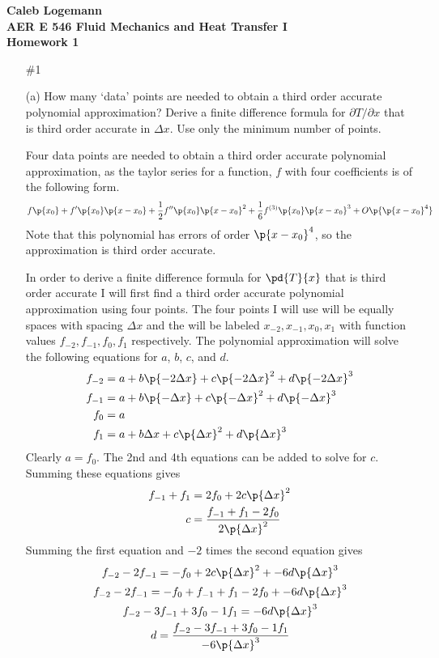 \documentclass[11pt, oneside]{article}
\begin{document}
\noindent \textbf{\Large{Caleb Logemann \\
AER E 546 Fluid Mechanics and Heat Transfer I \\
Homework 1
}}

%
\begin{enumerate}
  \item[\#1] %
    \item[(a)] %
      How many `data' points are needed to obtain a third order accurate
      polynomial approximation?
      Derive a finite difference formula for $\partial T/\partial x$ that is
      third order accurate in $\Delta x$.
      Use only the minimum number of points.

      Four data points are needed to obtain a third order accurate polynomial
      approximation, as the taylor series for a function, $f$ with four coefficients
      is of the following form.
      \[
        f\p{x_0} + f'\p{x_0} \p{x-x_0} + \frac{1}{2} f''\p{x_0} \p{x - x_0}^2 + \frac{1}{6} f^{(3)}\p{x_0} \p{x - x_0}^3 + O\p{\p{x - x_0}^4}
      \]
      Note that this polynomial has errors of order $\p{x - x_0}^4$, so the
      approximation is third order accurate.

      In order to derive a finite difference formula for $\pd{T}{x}$ that is
      third order accurate I will first find a third order accurate polynomial
      approximation using four points.
      The four points I will use will be equally spaces with spacing $\Delta x$
      and the will be labeled $x_{-2}, x_{-1}, x_0, x_1$ with function values
      $f_{-2}, f_{-1}, f_0, f_1$ respectively.
      The polynomial approximation will solve the following equations for
      $a$, $b$, $c$, and $d$.
      \begin{align*}
        f_{-2} &= a + b \p{-2 \Delta x} + c \p{-2 \Delta x}^2 + d \p{-2 \Delta x}^3 \\
        f_{-1} &= a + b \p{-\Delta x} + c \p{-\Delta x}^2 + d \p{-\Delta x}^3 \\
        f_0 &= a \\
        f_1 &= a + b \Delta x + c \p{\Delta x}^2 + d \p{\Delta x}^3
      \end{align*}
      Clearly $a = f_0$.
      The 2nd and 4th equations can be added to solve for $c$.
      Summing these equations gives
      \begin{align*}
        f_{-1} + f_1 &= 2f_0 + 2 c \p{\Delta x}^2 \\
        c &= \frac{f_{-1} + f_1 - 2 f_0}{2 \p{\Delta x}^2}
      \end{align*}
      Summing the first equation and $-2$ times the second equation gives
      \begin{gather*}
        f_{-2} - 2 f_{-1} = -f_0 + 2 c \p{\Delta x}^2 + -6 d \p{\Delta x}^3 \\
        f_{-2} - 2 f_{-1} = -f_0 + f_{-1} + f_1 - 2 f_0 + -6 d \p{\Delta x}^3 \\
        f_{-2} - 3 f_{-1} + 3 f_0 - 1 f_1 = -6 d \p{\Delta x}^3 \\
        d = \frac{f_{-2} - 3 f_{-1} + 3 f_0 - 1 f_1}{-6 \p{\Delta x}^3}
      \end{gather*}


\end{enumerate}
\end{document}
